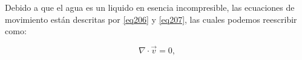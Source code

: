 
Debido a que el agua es un liquido en esencia incompresible, las ecuaciones de movimiento están descritas por \ref{eq206} y \ref{eq207}, las cuales podemos reescribir como:

\begin{equation}\label{eq208}
   \nabla \cdot \vec{v} = 0,
\end{equation}

